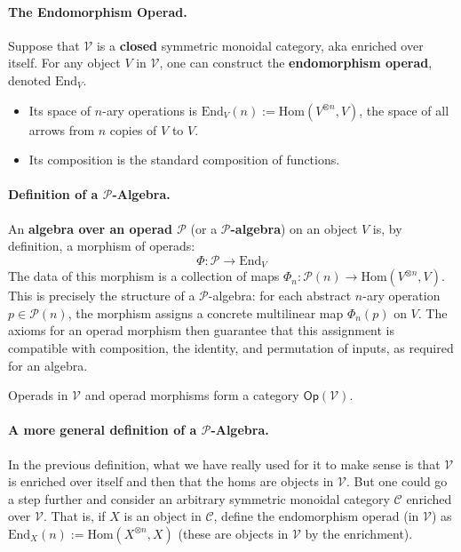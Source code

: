 \documentclass[11pt]{article}
\newcommand{\cat}[1]{\mathcal{#1}}
\newcommand{\C}{\mathcal{C}}
\theoremstyle{definition}
\begin{document}
\paragraph{The Endomorphism Operad.} Suppose that $\cat{V}$ is a \textbf{closed} symmetric monoidal category, aka enriched over itself. For any object $V$ in $\cat{V}$, one can construct the \textbf{endomorphism operad}, denoted $\mathrm{End}_V$.
\begin{itemize}
    \item Its space of $n$-ary operations is $\mathrm{End}_V(n) := \mathrm{Hom}(V^{\otimes n}, V)$, the space of all arrows from $n$ copies of $V$ to $V$.
    \item Its composition is the standard composition of functions.
\end{itemize}

\paragraph{Definition of a $\mathcal{P}$-Algebra.} An \textbf{algebra over an operad $\mathcal{P}$} (or a \textbf{$\mathcal{P}$-algebra}) on an object $V$ is, by definition, a morphism of operads:
\[
    \Phi: \mathcal{P} \to \mathrm{End}_V
\]
The data of this morphism is a collection of maps $\Phi_n : \mathcal{P}(n) \to \mathrm{Hom}(V^{\otimes n}, V)$. This is precisely the structure of a $\mathcal{P}$-algebra: for each abstract $n$-ary operation $p \in \mathcal{P}(n)$, the morphism assigns a concrete multilinear map $\Phi_n(p)$ on $V$. The axioms for an operad morphism then guarantee that this assignment is compatible with composition, the identity, and permutation of inputs, as required for an algebra.

Operads in $\cat{V}$ and operad morphisms form a category $\mathsf{Op}(\cat{V})$.


\paragraph{A more general definition of a $\mathcal{P}$-Algebra.}

In the previous definition, what we have really used for it to make sense is that $\cat{V}$ is enriched over itself and then that the homs are objects in $\cat{V}$. But one could go a step further and consider an arbitrary symmetric monoidal category  $\mathcal{C}$ enriched over $\cat{V}$. That is, if $X$ is an object in $\C$, define the endomorphism  operad (in $\cat{V}$) as  $\text{End}_X(n):= \text{Hom}(X^{\otimes n},X)$ (these are objects in $\cat{V}$ by the enrichment).
\end{document}
